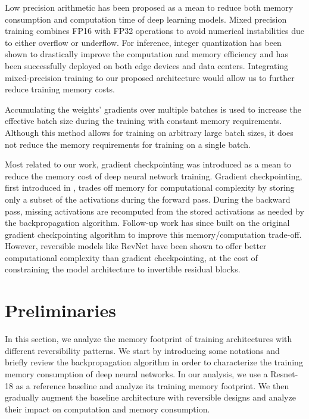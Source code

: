 \documentclass[twocolumn]{bmcart}
\begin{document}
Low precision arithmetic has been proposed as a mean to reduce both memory consumption and computation time of deep learning models. Mixed precision training \cite{micikevicius2017mixed} combines FP16 with FP32 operations to avoid numerical instabilities due to either overflow or underflow.
For inference, integer quantization \cite{jacob2018quantization,wu2018training} has been shown to drastically improve the computation and memory efficiency and has been successfully deployed on both edge devices and data centers.
Integrating mixed-precision training to our proposed architecture would allow us to further reduce training memory costs.

Accumulating the weights' gradients over multiple batches is used to increase the effective batch size during the training with constant memory requirements.
Although this method allows for training on arbitrary large batch sizes, it does not reduce the memory requirements for training on a single batch.

Most related to our work, gradient checkpointing was introduced as a mean to reduce the memory cost of deep neural network training.
Gradient checkpointing, first introduced in \cite{martens2012training}, trades off memory for computational complexity by storing only a subset of the activations during the forward pass.
During the backward pass, missing activations are recomputed from the stored activations as needed by the backpropagation algorithm.
Follow-up work \cite{chen2016training} has since built on the original gradient checkpointing algorithm to improve this memory/computation trade-off.
However, reversible models like RevNet have been shown to offer better computational complexity than gradient checkpointing,
at the cost of constraining the model architecture to invertible residual blocks.

\section{Preliminaries}

In this section, we analyze the memory footprint of training architectures with different reversibility patterns.
We start by introducing some notations and briefly review the backpropagation algorithm
in order to characterize the training memory consumption of deep neural networks.
In our analysis, we use a Resnet-18 as a reference baseline and analyze its training memory footprint.
We then gradually augment the baseline architecture with reversible designs and analyze their impact on computation and memory consumption.
\end{document}
